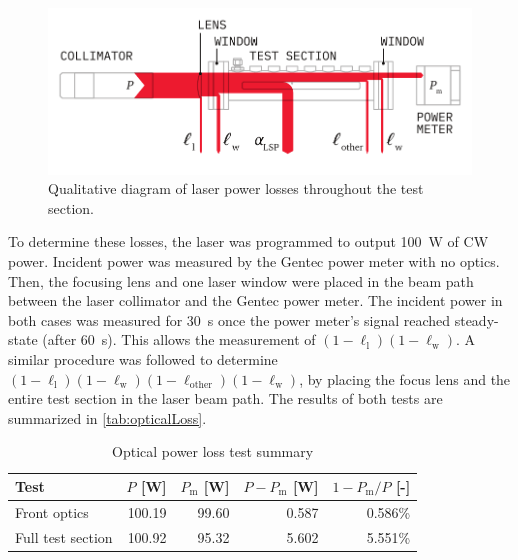                 \begin{figure}[h]
                    \centering
                    \includegraphics[]{assets/3 design/sankeyOptics}
                    \caption{Qualitative diagram of laser power losses throughout the test section.}
                    \label{fig:sankeyOptics}
                \end{figure}

                To determine these losses, the laser was programmed to output \qty{100}{W} of CW power. Incident power was measured by the Gentec power meter with no optics. Then, the focusing lens and one laser window were placed in the beam path between the laser collimator and the Gentec power meter. The incident power in both cases was measured for 30~s once the power meter's signal reached steady-state (after 60~s). This allows the measurement of $(1-\ell_\mathrm{l})(1-\ell_\mathrm{w})$. A similar procedure was followed to determine $(1-\ell_\mathrm{l})(1-\ell_\mathrm{w})(1-\ell_\mathrm{other})(1-\ell_\mathrm{w})$, by placing the focus lens and the entire test section in the laser beam path. The results of both tests are summarized in \autoref{tab:opticalLoss}.

                \begin{table}[h]
                    \centering
                    \caption{Optical power loss test summary}
                    \label{tab:opticalLoss}
                    \begin{tabular}{lrrrr}
                        \toprule
                        Test        & $P$ [W]   & $P_\mathrm{m}$ [W]    & $P-P_\mathrm{m}$ [W]  & $1-P_\mathrm{m}/P$ [-] \\
                        \midrule
                        Front optics    & 100.19    & 99.60 & 0.587  & 0.586\% \\
                        Full test section    & 100.92    & 95.32 & 5.602  & 5.551\% \\
                        \bottomrule
                    \end{tabular}
                \end{table}

